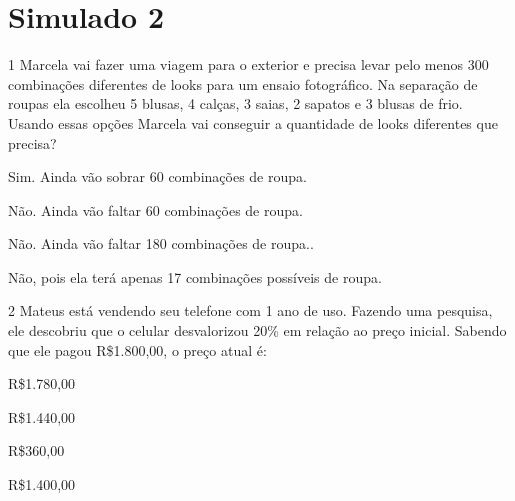 \pagebreak

\section*{Simulado 2}

\num{1} Marcela vai fazer uma viagem para o exterior e precisa levar pelo
menos 300 combinações diferentes de looks para um ensaio fotográfico. Na
separação de roupas ela escolheu 5 blusas, 4 calças, 3 saias, 2 sapatos
e 3 blusas de frio. Usando essas opções Marcela vai conseguir a
quantidade de looks diferentes que precisa?

\begin{escolha}
\item Sim. Ainda vão sobrar 60 combinações de roupa.
\item Não. Ainda vão faltar 60 combinações de roupa.
\item Não. Ainda vão faltar 180 combinações de roupa..
\item Não, pois ela terá apenas 17 combinações possíveis de roupa.
\end{escolha}



\num{2} Mateus está vendendo seu telefone com 1 ano de uso. Fazendo uma
pesquisa, ele descobriu que o celular desvalorizou 20\% em relação ao
preço inicial. Sabendo que ele pagou R\$1.800,00, o preço atual é:

\begin{escolha}
\item R\$1.780,00
\item R\$1.440,00
\item R\$360,00
\item R\$1.400,00
\end{escolha}


